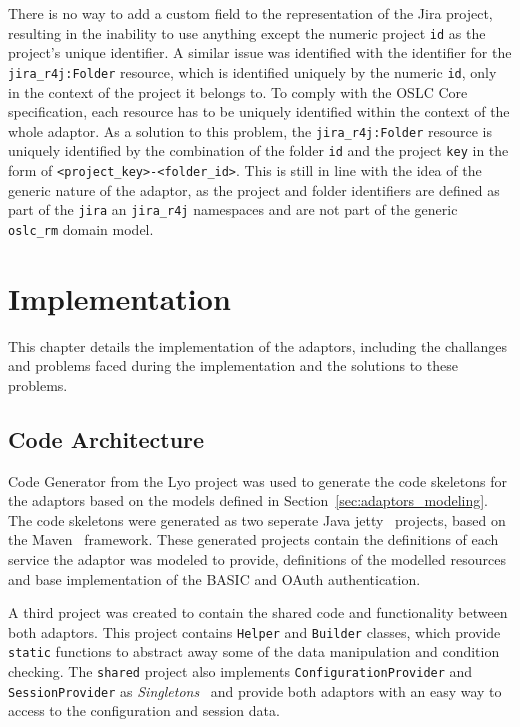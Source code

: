 There is no way to add a custom field to the representation of the Jira project, resulting in the inability to use anything except the numeric project \texttt{id} as the project's unique identifier. A similar issue was identified with the identifier for the \texttt{jira\_r4j:Folder} resource, which is identified uniquely by the numeric \texttt{id}, only in the context of the project it belongs to. To comply with the OSLC Core specification, each resource has to be uniquely identified within the context of the whole adaptor. As a solution to this problem, the \texttt{jira\_r4j:Folder} resource is uniquely identified by the combination of the folder \texttt{id} and the project \texttt{key} in the form of \texttt{<project\_key>-<folder\_id>}. This is still in line with the idea of the generic nature of the adaptor, as the project and folder identifiers are defined as part of the \texttt{jira} an \texttt{jira\_r4j} namespaces and are not part of the generic \texttt{oslc\_rm} domain model.


\chapter{Implementation}
This chapter details the implementation of the adaptors, including the challanges and problems faced during the implementation and the solutions to these problems.

\section{Code Architecture}
Code Generator from the Lyo project was used to generate the code skeletons for the adaptors based on the models defined in Section \ref{sec:adaptors_modeling}. The code skeletons were generated as two seperate Java jetty \cite{jetty} projects, based on the Maven \cite{maven} framework. These generated projects contain the definitions of each service the adaptor was modeled to provide, definitions of the modelled resources and base implementation of the BASIC and OAuth authentication.

A third project was created to contain the shared code and functionality between both adaptors. This project contains \texttt{Helper} and \texttt{Builder} classes, which provide \texttt{static} functions to abstract away some of the data manipulation and condition checking. The \texttt{shared} project also implements \texttt{ConfigurationProvider} and \texttt{SessionProvider} as \emph{Singletons} \cite{singleton_design_pattern} and provide both adaptors with an easy way to access to the configuration and session data.

